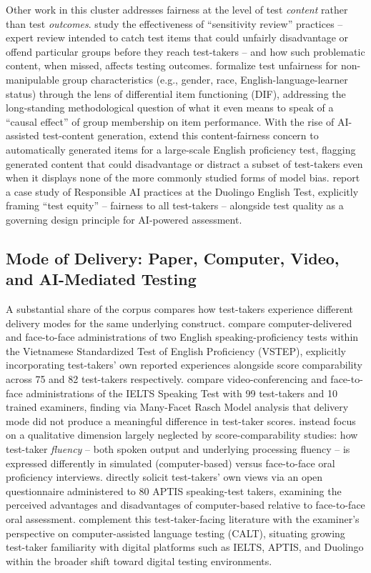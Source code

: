 \documentclass[11pt]{article}
\begin{document}
Other work in this cluster addresses fairness at the level of test \emph{content} rather than test \emph{outcomes}. \citet{grand2013sensitivity} study the effectiveness of ``sensitivity review'' practices -- expert review intended to catch test items that could unfairly disadvantage or offend particular groups before they reach test-takers -- and how such problematic content, when missed, affects testing outcomes. \citet{suk2026unfairness} formalize test unfairness for non-manipulable group characteristics (e.g., gender, race, English-language-learner status) through the lens of differential item functioning (DIF), addressing the long-standing methodological question of what it even means to speak of a ``causal effect'' of group membership on item performance. With the rise of AI-assisted test-content generation, \citet{stowe2024fairness} extend this content-fairness concern to automatically generated items for a large-scale English proficiency test, flagging generated content that could disadvantage or distract a subset of test-takers even when it displays none of the more commonly studied forms of model bias. \citet{burstein2024responsible} report a case study of Responsible AI practices at the Duolingo English Test, explicitly framing ``test equity'' -- fairness to all test-takers -- alongside test quality as a governing design principle for AI-powered assessment.

\subsection{Mode of Delivery: Paper, Computer, Video, and AI-Mediated Testing}

A substantial share of the corpus compares how test-takers experience different delivery modes for the same underlying construct. \citet{dang2024vstep} compare computer-delivered and face-to-face administrations of two English speaking-proficiency tests within the Vietnamese Standardized Test of English Proficiency (VSTEP), explicitly incorporating test-takers' own reported experiences alongside score comparability across 75 and 82 test-takers respectively. \citet{nakatsuhara2021videoconferencing} compare video-conferencing and face-to-face administrations of the IELTS Speaking Test with 99 test-takers and 10 trained examiners, finding via Many-Facet Rasch Model analysis that delivery mode did not produce a meaningful difference in test-taker scores. \citet{quaid2021fluency} instead focus on a qualitative dimension largely neglected by score-comparability studies: how test-taker \emph{fluency} -- both spoken output and underlying processing fluency -- is expressed differently in simulated (computer-based) versus face-to-face oral proficiency interviews. \citet{amengual2017views} directly solicit test-takers' own views via an open questionnaire administered to 80 APTIS speaking-test takers, examining the perceived advantages and disadvantages of computer-based relative to face-to-face oral assessment. \citet{nguyen2026examiners} complement this test-taker-facing literature with the examiner's perspective on computer-assisted language testing (CALT), situating growing test-taker familiarity with digital platforms such as IELTS, APTIS, and Duolingo within the broader shift toward digital testing environments.
\end{document}
